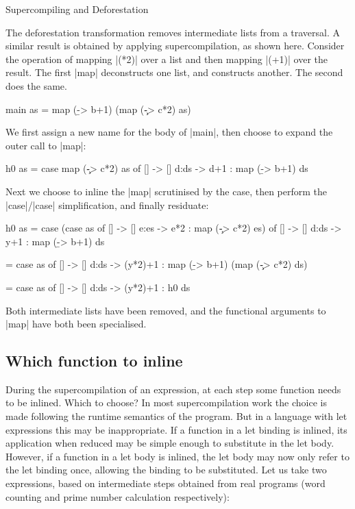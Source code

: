 \begin{examplename}{Supercompiling and Deforestation}

The deforestation transformation \cite{wadler:deforestation} removes intermediate lists from a traversal. A similar result is obtained by applying supercompilation, as shown here. Consider the operation of mapping |(*2)| over a list and then mapping |(+1)| over the result. The first |map| deconstructs one list, and constructs another. The second does the same.

\begin{code}
main as = map (\b -> b+1) (map (\c -> c*2) as)
\end{code}

We first assign a new name for the body of |main|, then choose to expand the outer call to |map|:

\begin{code}
h0 as = case  map (\c -> c*2) as of
              []    -> []
              d:ds  -> d+1 : map (\b -> b+1) ds
\end{code}

Next we choose to inline the |map| scrutinised by the case, then perform the |case|/|case| simplification, and finally residuate:

\begin{code}
h0 as  = case  (case  as of
                      []    -> []
                      e:es  -> e*2 : map (\c -> c*2) es) of
               []    -> []
               d:ds  -> y+1 : map (\b -> b+1) ds

       = case  as of
               []    -> []
               d:ds  -> (y*2)+1 : map (\b -> b+1) (map (\c -> c*2) ds)

       = case  as of
               []    -> []
               d:ds  -> (y*2)+1 : h0 ds
\end{code}

Both intermediate lists have been removed, and the functional arguments to |map| have both been specialised.
\end{examplename}

\subsection{Which function to inline}

During the supercompilation of an expression, at each step some function needs to be inlined. Which to choose? In most supercompilation work the choice is made following the runtime semantics of the program. But in a language with let expressions this may be inappropriate. If a function in a let binding is inlined, its application when reduced may be simple enough to substitute in the let body. However, if a function in a let body is inlined, the let body may now only refer to the let binding once, allowing the binding to be substituted. Let us take two expressions, based on intermediate steps obtained from real programs (word counting and prime number calculation respectively):


